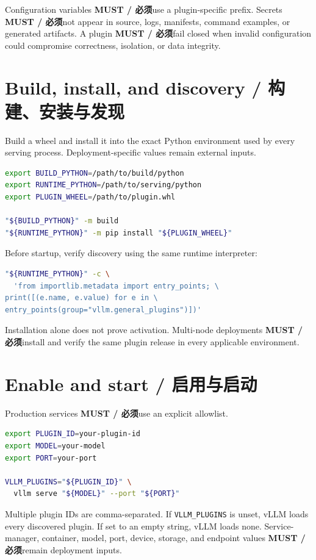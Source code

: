 \documentclass[11pt,a4paper,fontset=none]{ctexart}
\newcommand{\must}{\textbf{MUST / 必须}}
\begin{document}
Configuration variables \must use a plugin-specific prefix. Secrets \must not appear in source,
logs, manifests, command examples, or generated artifacts. A plugin \must fail closed when invalid
configuration could compromise correctness, isolation, or data integrity.

\section{Build, install, and discovery / 构建、安装与发现}

Build a wheel and install it into the exact Python environment used by every serving process.
Deployment-specific values remain external inputs.

\begin{lstlisting}[language=bash]
export BUILD_PYTHON=/path/to/build/python
export RUNTIME_PYTHON=/path/to/serving/python
export PLUGIN_WHEEL=/path/to/plugin.whl

"${BUILD_PYTHON}" -m build
"${RUNTIME_PYTHON}" -m pip install "${PLUGIN_WHEEL}"
\end{lstlisting}

Before startup, verify discovery using the same runtime interpreter:

\begin{lstlisting}[language=bash]
"${RUNTIME_PYTHON}" -c \
  'from importlib.metadata import entry_points; \
print([(e.name, e.value) for e in \
entry_points(group="vllm.general_plugins")])'
\end{lstlisting}

Installation alone does not prove activation. Multi-node deployments \must install and verify the
same plugin release in every applicable environment.

\section{Enable and start / 启用与启动}

Production services \must use an explicit allowlist.

\begin{lstlisting}[language=bash]
export PLUGIN_ID=your-plugin-id
export MODEL=your-model
export PORT=your-port

VLLM_PLUGINS="${PLUGIN_ID}" \
  vllm serve "${MODEL}" --port "${PORT}"
\end{lstlisting}

Multiple plugin IDs are comma-separated. If \texttt{VLLM\_PLUGINS} is unset, vLLM loads every
discovered plugin. If set to an empty string, vLLM loads none. Service-manager, container, model,
port, device, storage, and endpoint values \must remain deployment inputs.
\end{document}
